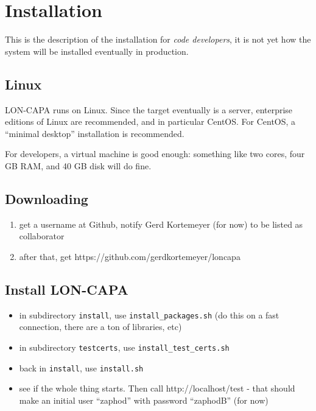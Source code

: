 \chapter{Installation}
This is the description of the installation for {\it code developers}, it is not yet how the system will be installed eventually in production.
\section{Linux}
LON-CAPA runs on Linux. Since the target eventually is a server, enterprise editions of Linux are recommended, and in particular CentOS. For CentOS, a ``minimal desktop'' installation is recommended.

For developers, a virtual machine is good enough: something like two cores, four GB RAM, and 40 GB disk will do fine.
\section{Downloading}
\begin{enumerate}
\item get a username at Github, notify Gerd Kortemeyer (for now) to be listed as collaborator
\item after that, get https://github.com/gerdkortemeyer/loncapa
\end{enumerate}
\section{Install LON-CAPA}
\begin{itemize}
\item in subdirectory {\tt install}, use {\tt install\_packages.sh} (do this on a fast connection, there are a ton of libraries, etc)
\item in subdirectory {\tt testcerts}, use {\tt install\_test\_certs.sh}
\item back in {\tt install}, use {\tt install.sh}
\item see if the whole thing starts. Then call http://localhost/test - that should make an initial user ``zaphod'' with password ``zaphodB'' (for now)
\end{itemize}

